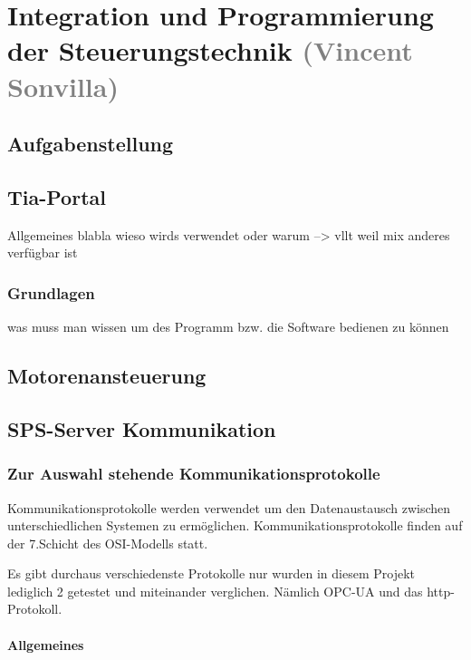 \section{Integration und Programmierung der Steuerungstechnik \textcolor{gray}{ (Vincent Sonvilla)}}


\subsection{Aufgabenstellung}

\subsection{Tia-Portal}

Allgemeines blabla
wieso wirds verwendet oder warum --> vllt weil mix anderes verfügbar ist

    \subsubsection{Grundlagen}
    was muss man wissen um des Programm bzw. die Software bedienen zu können
    \subsubsection{}

\subsection{Motorenansteuerung}

\subsection{SPS-Server Kommunikation}

    \subsubsection{Zur Auswahl stehende Kommunikationsprotokolle}

    Kommunikationsprotokolle werden verwendet um den Datenaustausch zwischen unterschiedlichen Systemen zu ermöglichen.
    Kommunikationsprotokolle finden auf der 7.Schicht des OSI-Modells statt.

    Es gibt durchaus verschiedenste Protokolle nur wurden in diesem Projekt lediglich 2 getestet und miteinander verglichen. Nämlich OPC-UA und das http-Protokoll.


         \paragraph{Allgemeines}

